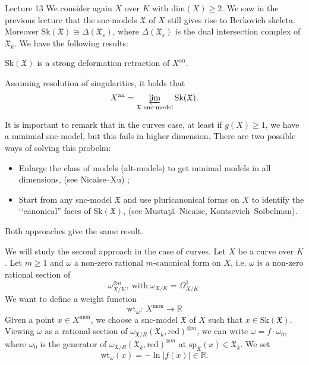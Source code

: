 
\begin{section}{Lecture 13}
We consider again $X$ over $K$ with dim$(X) \geq 2$. We saw in the previous lecture that the snc-models $\mathfrak{X}$ of $X$ still gives rise to Berkovich skeleta. Moreover Sk$(\mathfrak{X}) \cong \Delta(\mathfrak{X}_s)$, where $\Delta(\mathfrak{X}_s)$ is the dual intersection complex of $\mathfrak{X}_k$. We have the following results: 
\begin{theorem}
 Sk$(\mathfrak{X})$ is a strong deformation retraction of $X^{\textrm{an}}$. 
\end{theorem}
\begin{theorem}
 Assuming resolution of singularities, it holds that
 \[
  X^{\textrm{an}} = \varprojlim_{\mathfrak{X} \ \textrm{snc-model}} \textrm{Sk}(\mathfrak{X}).
 \]
\end{theorem}
It is important to remark that in the curves case, at least if $g(X) \geq 1$, we have a minimial snc-model, but this fails in higher dimension. There are two possible ways of solving this probelm:
\begin{itemize}
 \item Enlarge the class of models (alt-models) to get minimal models in all dimensions, (see Nicaise--Xu) ;
 \item Start from any snc-model $\mathfrak{X}$ and use pluricanonical forms on $X$ to identify the  \lq \lq canonical'' faces of Sk$(\mathfrak{X})$, (see Musta\c{t}\u{a}--Nicaise, Kontsevich--Soibelman).
\end{itemize}

\begin{theorem}[Nicaise--Xu]
 Both approaches give the same result.
\end{theorem}
We will study the second approach in the case of curves. Let $X$ be a curve over $K$. Let $m \geq 1$ and $\omega$ a non-zero rational $m$-canonical form on $X$, i.e. $\omega$ is a non-zero rational section of 
\[
 \omega^{\otimes n}_{X/K}, \ \textrm{with} \ \omega_{X/K} = \Omega^1_{X/K}. 
\]
We want to define a weight function
\[
 \textrm{wt}_{\omega}: \ X^{\textrm{mon}} \rightarrow \mathbb{R}
\]
Given a point $x \in X^{\textrm{mon}}$, we choose a snc-model $\mathfrak{X}$ of $X$ such that $x \in \textrm{Sk}(\mathfrak{X})$. Viewing $\omega$ as a rational section of $\omega_{\mathfrak{X}/R}(\mathfrak{X}_{k},\textrm{red})^{\otimes m}$, we can write $\omega = f \cdot \omega_0$, where $\omega_0$ is the generator of $\omega_{\mathfrak{X}/R}(\mathfrak{X}_{k},\textrm{red})^{\otimes m}$ at $\textrm{sp}_{\mathfrak{X}} (x) \in \mathfrak{X}_k$. We set 
\[
 \textrm{wt}_{\omega}(x) = -\ln|f(x)| \in \mathbb{R}.
\]
 


\end{section}
